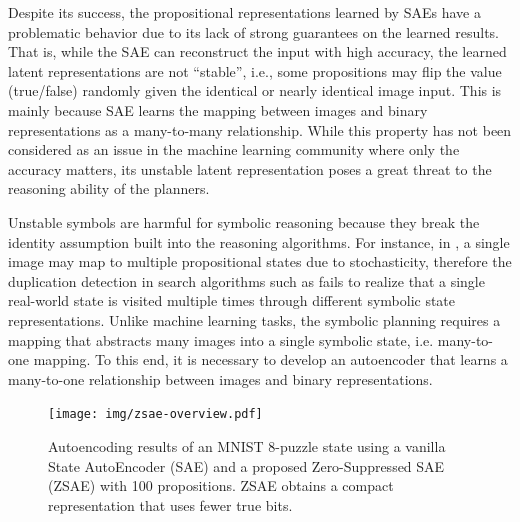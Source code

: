Despite its success,
the propositional representations learned by SAEs have a problematic behavior
due to its lack of strong guarantees on the learned results.
% 
That is, while the SAE can reconstruct the input with high accuracy,
the learned latent representations are not ``stable'', i.e.,
some propositions may flip the value (true/false) randomly
given the identical or nearly identical image input.
% 
% 
This is mainly because SAE learns the mapping between images and binary representations as a many-to-many relationship.
While this property has not been considered as an issue in the machine learning community where only the accuracy matters,
its unstable latent representation poses a great threat to the reasoning ability of the planners.

Unstable symbols are harmful for symbolic reasoning because
they break the identity assumption built into the reasoning algorithms.
For instance, in \latentplanner, 
a single image may map to multiple propositional states due to stochasticity,
therefore the duplication detection in search algorithms such as \astar \cite{hart1968formal}
fails to realize that a single real-world state is visited multiple times through
different symbolic state representations.
% 
Unlike machine learning tasks,
the symbolic planning requires a mapping
that abstracts many images into a single symbolic state, i.e. many-to-one mapping.
% 
To this end, it is necessary to develop an autoencoder that learns a
many-to-one relationship between images and binary representations.

\begin{figure}[tb]
 \centering
 \texttt{[image: img/zsae-overview.pdf]}
 \caption{
Autoencoding results of an MNIST 8-puzzle state
using a vanilla State AutoEncoder (SAE) \cite{Asai2018} and a proposed Zero-Suppressed SAE (ZSAE) with 100 propositions.
ZSAE obtains a compact representation that uses fewer true bits.
}
 \label{zsae-overview}
\end{figure}

